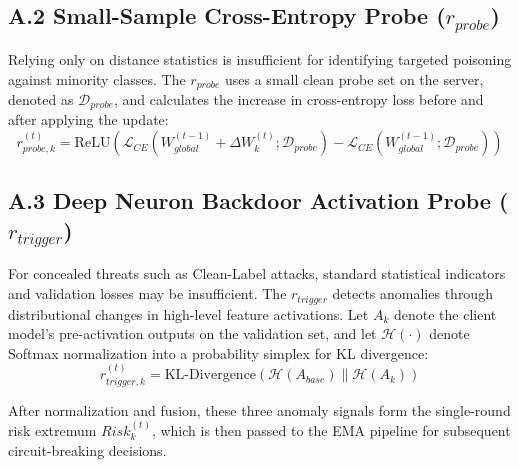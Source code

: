 \documentclass[runningheads,orivec]{llncs}
\begin{document}
\subsection{A.2 Small-Sample Cross-Entropy Probe \texorpdfstring{($r_{probe}$)}{(r-probe)}}
Relying only on distance statistics is insufficient for identifying targeted poisoning against minority classes. The $r_{probe}$ uses a small clean probe set on the server, denoted as $\mathcal{D}_{probe}$, and calculates the increase in cross-entropy loss before and after applying the update:
\begin{equation}
    r_{probe, k}^{(t)} = \text{ReLU}\left( \mathcal{L}_{CE}(W_{global}^{(t-1)} + \Delta W_k^{(t)}; \mathcal{D}_{probe}) - \mathcal{L}_{CE}(W_{global}^{(t-1)}; \mathcal{D}_{probe}) \right)
\end{equation}

\subsection{A.3 Deep Neuron Backdoor Activation Probe \texorpdfstring{($r_{trigger}$)}{(r-trigger)}}
For concealed threats such as Clean-Label attacks, standard statistical indicators and validation losses may be insufficient. The $r_{trigger}$ detects anomalies through distributional changes in high-level feature activations. Let $A_k$ denote the client model's pre-activation outputs on the validation set, and let $\mathcal{H}(\cdot)$ denote Softmax normalization into a probability simplex for KL divergence:
\begin{equation}
    r_{trigger, k}^{(t)} = \text{KL-Divergence}\left( \mathcal{H}(A_{base}) \| \mathcal{H}(A_k) \right)
\end{equation}

After normalization and fusion, these three anomaly signals form the single-round risk extremum $Risk_{k}^{(t)}$, which is then passed to the EMA pipeline for subsequent circuit-breaking decisions.
\end{document}
